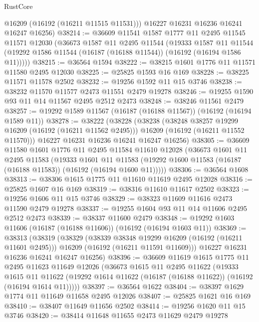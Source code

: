 \begin{lexlean}{RustCore}
\begin{coremodule}
        @16209
        (@16192 (@16211 @11515 @11531)))
      @16227
      @16231
      @16236
      @16241
      @16247
      @16256)
@38214 := @36609
    @11541
    @1587
    @1777
    @11
    @2495
    @11545
    @11571
    @12030
    (@36673
      @1587
      @11
      @2495
      @11544
      (@19333
        @1587
        @11
        @11544
        (@19292 @1586 @11544 (@16187 (@16188 @11544)) (@16192 (@16194 @1586 @11)))))
@38215 := @36564 @1594
@38222 := @38215 @1601 @1776 @11 @11571 @11580 @2495 @12030
@38225 := @25825 @1593 @16 @169
@38228 := @38225 @11571 @11578 @2502
@38232 := @19256 @1592 @11 @15 @3746
@38238 := @38232 @11570 @11577 @2473 @11551 @2479 @19278
@38246 := @19255 @1590 @93 @11 @14 @11567 @2495 @2512 @2473
@38248 := @38246 @11561 @2479
@38257 := @19292 @1589 @11567 (@16187 (@16188 @11567)) (@16192 (@16194 @1589 @11))
@38278 := @38222
    (@38228
      (@38238
        (@38248 @38257 @19299 @16209 (@16192 (@16211 @11562 @2495)))
        @16209
        (@16192 (@16211 @11552 @11570)))
      @16227
      @16231
      @16236
      @16241
      @16247
      @16256)
@38305 := @36609
    @11580
    @1601
    @1776
    @11
    @2495
    @11584
    @11610
    @12028
    (@36673
      @1601
      @11
      @2495
      @11583
      (@19333
        @1601
        @11
        @11583
        (@19292 @1600 @11583 (@16187 (@16188 @11583)) (@16192 (@16194 @1600 @11)))))
@38306 := @36564 @1608
@38313 := @38306 @1615 @1775 @11 @11610 @11619 @2495 @12028
@38316 := @25825 @1607 @16 @169
@38319 := @38316 @11610 @11617 @2502
@38323 := @19256 @1606 @11 @15 @3746
@38329 := @38323 @11609 @11616 @2473 @11590 @2479 @19278
@38337 := @19255 @1604 @93 @11 @14 @11606 @2495 @2512 @2473
@38339 := @38337 @11600 @2479
@38348 := @19292 @1603 @11606 (@16187 (@16188 @11606)) (@16192 (@16194 @1603 @11))
@38369 := @38313
    (@38319
      (@38329
        (@38339 @38348 @19299 @16209 (@16192 (@16211 @11601 @2495)))
        @16209
        (@16192 (@16211 @11591 @11609)))
      @16227
      @16231
      @16236
      @16241
      @16247
      @16256)
@38396 := @36609
    @11619
    @1615
    @1775
    @11
    @2495
    @11623
    @11649
    @12026
    (@36673
      @1615
      @11
      @2495
      @11622
      (@19333
        @1615
        @11
        @11622
        (@19292 @1614 @11622 (@16187 (@16188 @11622)) (@16192 (@16194 @1614 @11)))))
@38397 := @36564 @1622
@38404 := @38397 @1629 @1774 @11 @11649 @11658 @2495 @12026
@38407 := @25825 @1621 @16 @169
@38410 := @38407 @11649 @11656 @2502
@38414 := @19256 @1620 @11 @15 @3746
@38420 := @38414 @11648 @11655 @2473 @11629 @2479 @19278

\end{coremodule}
\end{lexlean}
